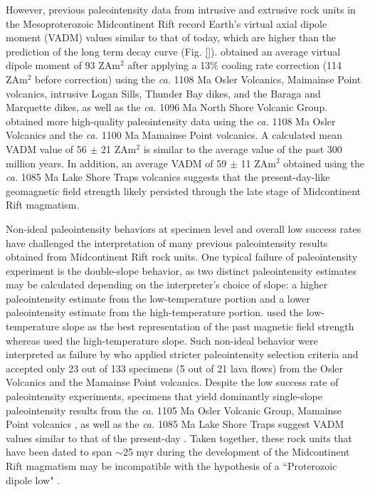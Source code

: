 \documentclass[draft]{agujournal2019}
\begin{document}
However, previous paleointensity data from intrusive and extrusive rock units in the Mesoproterozoic Midcontinent Rift \cite{Pesonen1983a, Kulakov2013a, Sprain2018a} record Earth's virtual axial dipole moment (VADM) values similar to that of today, which are higher than the prediction of the long term decay curve (Fig. \ref{}).  obtained an average virtual dipole moment of 93 ZAm$^2$ after applying a 13\% cooling rate correction (114 ZAm$^2$ before correction) using the \textit{ca.} 1108 Ma Osler Volcanics, Maimainse Point volcanics, intrusive Logan Sills, Thunder Bay dikes, and the Baraga and Marquette dikes, as well as the \textit{ca.} 1096 Ma North Shore Volcanic Group.  obtained more high-quality paleointensity data using the \textit{ca.} 1108 Ma Osler Volcanics and the \textit{ca.} 1100 Ma Mamainse Point volcanics. A calculated mean VADM value of 56 $\pm$ 21 ZAm$^2$ is similar to the average value of the past 300 million years. In addition, an average VADM of 59 $\pm$ 11 ZAm$^2$ obtained  using the \textit{ca.} 1085 Ma Lake Shore Traps volcanics suggests that the present-day-like geomagnetic field strength likely persisted through the late stage of Midcontinent Rift magmatism. 

Non-ideal paleointensity behaviors at specimen level and overall low success rates have challenged the interpretation of many previous paleointensity results obtained from Midcontinent Rift rock units. One typical failure of paleointensity experiment is the double-slope behavior, as two distinct paleointensity estimates may be calculated depending on the interpreter's choice of slope: a higher paleointensity estimate from the low-temperature portion and a lower paleointensity estimate from the high-temperature portion.  used the low-temperature slope as the best representation of the past magnetic field strength whereas  used the high-temperature slope. Such non-ideal behavior were interpreted as failure by  who applied stricter paleointensity selection criteria and accepted only 23 out of 133 specimens (5 out of 21 lava flows) from the Osler Volcanics and the Mamainse Point volcanics. Despite the low success rate of paleointensity experiments, specimens that yield dominantly single-slope paleointensity results from the \textit{ca.} 1105 Ma Osler Volcanic Group, Mamainse Point volcanics \cite{Sprain2018a}, as well as the \textit{ca.} 1085 Ma Lake Shore Traps \cite{Kulakov2013a} suggest VADM values similar to that of the present-day \cite{Sprain2018a}. Taken together, these rock units that have been dated to span $\sim$25 myr during the development of the Midcontinent Rift magmatism \cite{Swanson-Hysell2019a} may be incompatible with the hypothesis of a ``Proterozoic dipole low" \cite{Biggin2009a}. 
\end{document}
